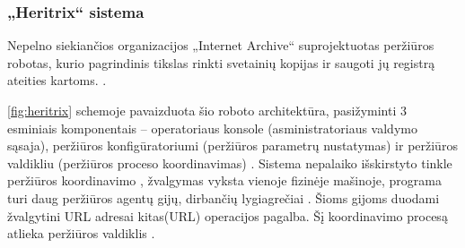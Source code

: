 \subsubsection{„Heritrix“ sistema}
Nepelno siekiančios organizacijos „Internet Archive“ suprojektuotas peržiūros robotas, kurio pagrindinis tikslas rinkti svetainių kopijas ir saugoti jų registrą ateities kartoms. \cite{HeritrixArchitecture}.

\ref{fig:heritrix} schemoje pavaizduota šio roboto architektūra, pasižyminti 3 esminiais komponentais -- operatoriaus konsole (asministratoriaus valdymo sąsaja), peržiūros konfigūratoriumi (peržiūros parametrų nustatymas) ir peržiūros valdikliu (peržiūros proceso koordinavimas) \cite{HeritrixArchitecture}. Sistema nepalaiko išskirstyto tinkle peržiūros koordinavimo \cite{HeritrixArchitecture}, žvalgymas vyksta vienoje fizinėje mašinoje, programa turi daug peržiūros agentų gijų, dirbančių lygiagrečiai \cite{HeritrixArchitecture}. Šioms gijoms duodami žvalgytini URL adresai kitas(URL) operacijos pagalba. Šį koordinavimo procesą atlieka peržiūros valdiklis \cite{HeritrixArchitecture}.
